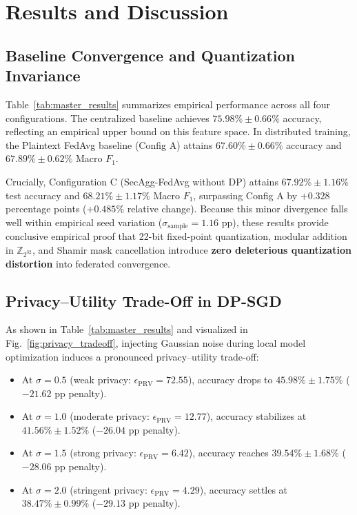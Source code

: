 \documentclass[journal,twocolumn,10pt]{IEEEtran}
\begin{document}
\section{Results and Discussion}
\subsection{Baseline Convergence and Quantization Invariance}
Table~\ref{tab:master_results} summarizes empirical performance across all four configurations. The centralized baseline achieves $75.98\% \pm 0.66\%$ accuracy, reflecting an empirical upper bound on this feature space. In distributed training, the Plaintext FedAvg baseline (Config A) attains $67.60\% \pm 0.66\%$ accuracy and $67.89\% \pm 0.62\%$ Macro $F_1$.

Crucially, Configuration C (SecAgg-FedAvg without DP) attains $67.92\% \pm 1.16\%$ test accuracy and $68.21\% \pm 1.17\%$ Macro $F_1$, surpassing Config A by $+0.328$ percentage points ($+0.485\%$ relative change). Because this minor divergence falls well within empirical seed variation ($\sigma_{\text{sample}} = 1.16\text{ pp}$), these results provide conclusive empirical proof that 22-bit fixed-point quantization, modular addition in $\mathbb{Z}_{2^{32}}$, and Shamir mask cancellation introduce \textbf{zero deleterious quantization distortion} into federated convergence.

\subsection{Privacy--Utility Trade-Off in DP-SGD}
As shown in Table~\ref{tab:master_results} and visualized in Fig.~\ref{fig:privacy_tradeoff}, injecting Gaussian noise during local model optimization induces a pronounced privacy--utility trade-off:
\begin{itemize}
    \item At $\sigma = 0.5$ (weak privacy: $\epsilon_{\text{PRV}} = 72.55$), accuracy drops to $45.98\% \pm 1.75\%$ ($-21.62$ pp penalty).
    \item At $\sigma = 1.0$ (moderate privacy: $\epsilon_{\text{PRV}} = 12.77$), accuracy stabilizes at $41.56\% \pm 1.52\%$ ($-26.04$ pp penalty).
    \item At $\sigma = 1.5$ (strong privacy: $\epsilon_{\text{PRV}} = 6.42$), accuracy reaches $39.54\% \pm 1.68\%$ ($-28.06$ pp penalty).
    \item At $\sigma = 2.0$ (stringent privacy: $\epsilon_{\text{PRV}} = 4.29$), accuracy settles at $38.47\% \pm 0.99\%$ ($-29.13$ pp penalty).
\end{itemize}
\end{document}
